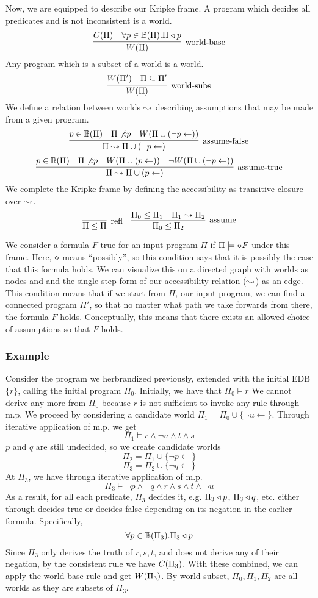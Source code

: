 Now, we are equipped to describe our Kripke frame.
A program which decides all predicates and is not inconsistent is a world.
\[
	\infer[\textrm{world-base}]{\world{\Pi}}{\cons{\Pi} & \forall p \in \hb(\Pi). \Pi \decides p}
\]
Any program which is a subset of a world is a world.
\[
	\infer[\textrm{world-subs}]{\world{\Pi}}{\world{\Pi'} & \Pi \subseteq \Pi'}
\]
We define a relation between worlds $\leadsto$ describing assumptions that may be made from a given program.
\[
	\infer[\textrm{assume-false}]{\Pi \stepass \Pi \cup (\neg p \leftarrow)}{p \in \hb(\Pi) & \Pi \not \decides p & \world{\Pi \cup (\neg p \leftarrow)}}
\]
\[
	\infer[\textrm{assume-true}]{\Pi \stepass \Pi \cup (p \leftarrow)}{p \in \hb(\Pi) & \Pi \not \decides p & \world{\Pi \cup (p \leftarrow)} & \neg \world{\Pi \cup (\neg p \leftarrow)}}
\]
We complete the Kripke frame by defining the accessibility as transitive closure over $\leadsto$.
\[
	\infer[\textrm{refl}]{\Pi \leq \Pi}{}
	\quad
	\infer[\textrm{assume}]{\Pi_0 \leq \Pi_2}{\Pi_0 \leq \Pi_1 & \Pi_1 \stepass \Pi_2}
\]

We consider a formula $F$ true for an input program $\Pi$ if $\Pi \models \diamond  F$ under this frame.
Here, $\diamond$ means ``possibly'', so this condition says that it is possibly the case that this formula holds.
We can visualize this on a directed graph with worlds as nodes and and the single-step form of our accessibility relation ($\leadsto$) as an edge.
This condition means that if we start from $\Pi$, our input program, we can find a connected program $\Pi'$, so that no matter what path we take forwards from there, the formula $F$ holds.
Conceptually, this means that there exists an allowed choice of assumptions so that $F$ holds.

\subsubsection{Example}
Consider the program we herbrandized previously, extended with the initial EDB $\{r\}$, calling the initial program $\Pi_0$.
Initially, we have that $\Pi_0 \models r$
We cannot derive any more from $\Pi_0$ because $r$ is not sufficient to invoke any rule through m.p.
We proceed by considering a candidate world $\Pi_1 = \Pi_0 \cup \{\neg u \leftarrow\}$.
Through iterative application of m.p. we get
\[
\Pi_1 \models r \wedge \neg u \wedge t \wedge s
\]
$p$ and $q$ are still undecided, so we create candidate worlds
\[\Pi_2 = \Pi_1 \cup \{\neg p \leftarrow\}\]
\[\Pi_3 = \Pi_2 \cup \{\neg q \leftarrow\}\]
At $\Pi_3$, we have through iterative application of m.p.
\[
\Pi_3 \models \neg p \wedge \neg q \wedge r \wedge s \wedge t \wedge \neg u
\]
As a result, for all each predicate, $\Pi_3$ decides it, e.g. $\Pi_3 \triangleleft p$, $\Pi_3 \triangleleft q$, etc. either through decides-true or decides-false depending on its negation in the earlier formula.
Specifically,
\[
\forall p \in \mathbb{B}(\Pi_3). \Pi_3 \triangleleft p
\]
Since $\Pi_3$ only derives the truth of $r, s, t$, and does not derive any of their negation, by the consistent rule we have $C(\Pi_3)$.
With these combined, we can apply the world-base rule and get $W({\Pi_3})$.
By world-subset, $\Pi_0, \Pi_1, \Pi_2$ are all worlds as they are subsets of $\Pi_3$.

